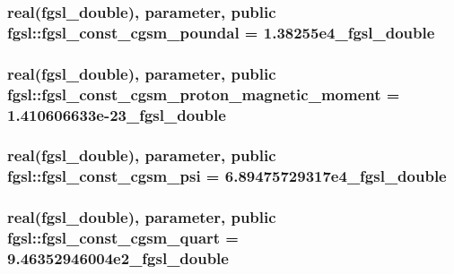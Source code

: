 \subsubsection[{fgsl\+\_\+const\+\_\+cgsm\+\_\+poundal}]{\setlength{\rightskip}{0pt plus 5cm}real({\bf fgsl\+\_\+double}), parameter, public fgsl\+::fgsl\+\_\+const\+\_\+cgsm\+\_\+poundal = 1.\+38255e4\+\_\+fgsl\+\_\+double}\label{namespacefgsl_a4453ec263f2b4c5802122e762e1672c4}
\hypertarget{namespacefgsl_a91a53064c6d7b4c8af4bf3368a896d74}{}
\subsubsection[{fgsl\+\_\+const\+\_\+cgsm\+\_\+proton\+\_\+magnetic\+\_\+moment}]{\setlength{\rightskip}{0pt plus 5cm}real({\bf fgsl\+\_\+double}), parameter, public fgsl\+::fgsl\+\_\+const\+\_\+cgsm\+\_\+proton\+\_\+magnetic\+\_\+moment = 1.\+410606633e-\/23\+\_\+fgsl\+\_\+double}\label{namespacefgsl_a91a53064c6d7b4c8af4bf3368a896d74}
\hypertarget{namespacefgsl_adbc0f817c0f6ab5ff3cb517430c2a28f}{}
\subsubsection[{fgsl\+\_\+const\+\_\+cgsm\+\_\+psi}]{\setlength{\rightskip}{0pt plus 5cm}real({\bf fgsl\+\_\+double}), parameter, public fgsl\+::fgsl\+\_\+const\+\_\+cgsm\+\_\+psi = 6.\+89475729317e4\+\_\+fgsl\+\_\+double}\label{namespacefgsl_adbc0f817c0f6ab5ff3cb517430c2a28f}
\hypertarget{namespacefgsl_a1dd9210eaaf96e8f99597ede1f808892}{}
\subsubsection[{fgsl\+\_\+const\+\_\+cgsm\+\_\+quart}]{\setlength{\rightskip}{0pt plus 5cm}real({\bf fgsl\+\_\+double}), parameter, public fgsl\+::fgsl\+\_\+const\+\_\+cgsm\+\_\+quart = 9.\+46352946004e2\+\_\+fgsl\+\_\+double}\label{namespacefgsl_a1dd9210eaaf96e8f99597ede1f808892}
\hypertarget{namespacefgsl_aa616f1f47c1a107f10dcb7418517b723}{}
